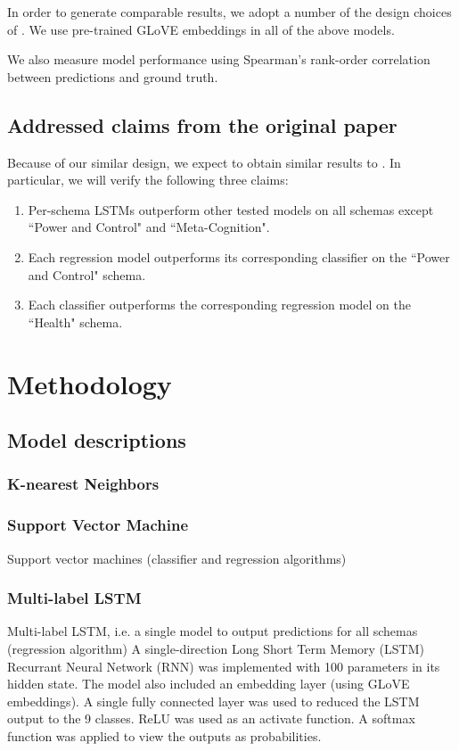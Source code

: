 \documentclass[11pt,a4paper]{article}
\begin{document}
In order to generate comparable results, we adopt a number of the design choices of \citeauthor{burger_2021}. We use pre-trained GLoVE embeddings \citep{pennington_2014} in all of the above models. 

We also measure model performance using Spearman's rank-order correlation between predictions and ground truth. 

\subsection{Addressed claims from the original paper}
Because of our similar design, we expect to obtain similar results to \citeauthor{burger_2021}. In particular, we will verify the following three claims:
\begin{enumerate}
    \item Per-schema LSTMs outperform other tested models on all schemas except ``Power and Control" and ``Meta-Cognition".
    \item Each regression model outperforms its corresponding classifier on the ``Power and Control" schema.
    \item Each classifier outperforms the corresponding regression model on the ``Health" schema.
\end{enumerate}

\section{Methodology}
\subsection{Model descriptions}
\subsubsection{K-nearest Neighbors}

\subsubsection{Support Vector Machine}
Support vector machines (classifier and regression algorithms)

\subsubsection{Multi-label LSTM}
Multi-label LSTM, i.e. a single model to output predictions for all schemas (regression algorithm)
A single-direction Long Short Term Memory (LSTM) Recurrant Neural Network (RNN) was implemented with 100 parameters in its hidden state. The model also included an embedding layer (using GLoVE embeddings). A single fully connected layer was used to reduced the LSTM output to the 9 classes. ReLU was used as an activate function. A softmax function was applied to view the outputs as probabilities. 
\end{document}
